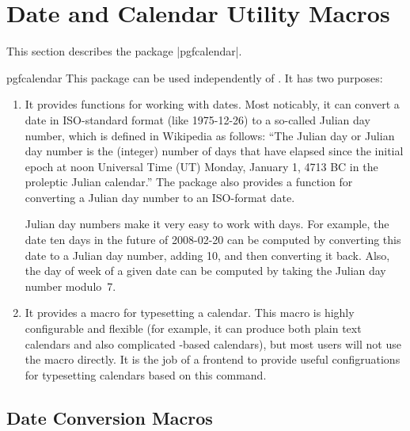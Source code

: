 %
%
%


\section{Date and Calendar Utility Macros}
\label{section-calendar}

This section describes the package |pgfcalendar|.

\begin{package}{pgfcalendar}
  This package can be used independently of \pgfname. It has two
  purposes:
  \begin{enumerate}
  \item It provides functions for working with dates. Most noticably,
    it can convert a date in ISO-standard format (like 1975-12-26) to
    a so-called Julian day number, which is defined in Wikipedia as
    follows:  ``The Julian day or Julian day number is the
    (integer) number of days that have elapsed since the initial epoch
    at noon Universal Time (UT) Monday, January 1, 4713 BC in the
    proleptic Julian calendar.'' The package also provides a function
    for converting a Julian day number to an ISO-format date.

    Julian day numbers make it very easy to work with days. For
    example, the date ten days in the future of 2008-02-20 can
    be computed by converting this date to a Julian day number, adding
    10, and then converting it back. Also, the day of week of a given
    date can be computed by taking the Julian day number modulo~7.
  \item It provides a macro for typesetting a calendar. This macro
    is highly configurable and flexible (for example, it can produce
    both plain text calendars and also complicated \tikzname-based
    calendars), but most users will not use the macro directly. It is
    the job of a frontend to provide useful configruations for
    typesetting calendars based on this command.
  \end{enumerate}
\end{package}


\subsection{Date Conversion Macros}

